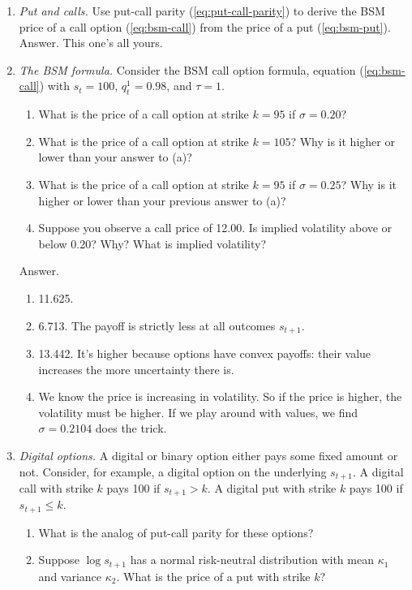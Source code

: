 \documentclass[11pt]{article}
\begin{document}
\begin{enumerate}
\item {\it Put and calls.\/}
Use put-call parity (\ref{eq:put-call-parity})
to derive the BSM price of a call option (\ref{eq:bsm-call})
from the price of a put (\ref{eq:bsm-put}).
%
Answer.  This one's all yours.

\item {\it The BSM formula.\/}
Consider the BSM call option formula, equation (\ref{eq:bsm-call})
with $s_t = 100$, $q^1_t = 0.98$, and $\tau = 1$.
%
\begin{enumerate}
\item What is the price of a call option at strike $k = 95$ if $\sigma = 0.20$?
\item What is the price of a call option at strike $k=105$?
Why is it higher or lower than your answer to (a)?
\item What is the price of a call option at strike $k = 95$ if $\sigma = 0.25$?
Why is it higher or lower than your previous answer to (a)?
\item Suppose you observe a call price of 12.00.
Is implied volatility above or below 0.20?
Why?
What is implied volatility?
\end{enumerate}
%
Answer.
\begin{enumerate}
\item 11.625.
\item 6.713. The payoff is strictly less at all outcomes $s_{t+1}$.
\item 13.442.
It's higher because options have convex payoffs:
their value increases the more uncertainty there is.
\item We know the price is increasing in volatility.
So if the price is higher, the volatility must be higher.
If we play around with values, we find $\sigma = 0.2104$ does the trick.
\end{enumerate}

\item {\it Digital options.\/}
A digital or binary option either pays some fixed amount or not.
Consider, for example, a digital option on the underlying $s_{t+1}$.
A digital call with strike $k$ pays 100 if $s_{t+1} > k$.
A digital put with strike $k$ pays 100 if $s_{t+1} \leq k$.
%
\begin{enumerate}
\item What is the analog of put-call parity for these options?

\item Suppose $\log s_{t+1}$ has a normal risk-neutral distribution
with mean $\kappa_1$ and variance $\kappa_2$.
What is the price of a put with strike $k$?


\end{enumerate}
\end{enumerate}
\end{document}
